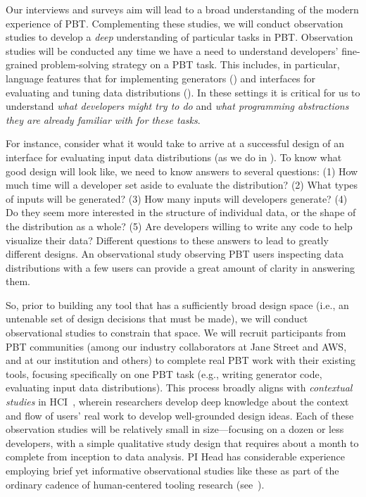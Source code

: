 %
Our interviews and surveys aim will lead to a broad understanding of
the modern experience of PBT. Complementing these studies, we will conduct
observation studies to develop a \emph{deep} understanding of particular tasks
in PBT. Observation studies will be conducted any time we have a need to
understand developers' fine-grained problem-solving strategy on a PBT task.
This includes, in particular, language features that for implementing
generators () and interfaces for evaluating and tuning data
distributions (). In these settings it is critical
for us to understand \emph{what developers might try to do} and \emph{what
programming abstractions they are already familiar with for these tasks}.

For instance, consider what it would take to arrive at a successful design of
an interface for evaluating input data distributions (as we do in
). To know what good design will look like, we need to know
answers to several questions: (1) How much time will a developer set aside to
evaluate the distribution? (2) What types of inputs will be generated? (3) How
many inputs will developers generate? (4) Do they seem more interested in
the structure of individual data, or the shape of the
distribution as a whole? (5) Are developers willing to write any code to
help visualize their data? Different questions to these answers to lead to
greatly different designs. An observational study observing PBT users
inspecting data distributions with a few users can provide a great amount of
clarity in answering them.

So, prior to building any tool that has a sufficiently broad design space (i.e., an
untenable set of design decisions that must be made), we will conduct
observational studies to constrain that space. We will recruit participants
from PBT communities (among our industry collaborators at Jane Street and AWS,
and at our institution and others) to complete real PBT work with their
existing tools, focusing specifically on one PBT task (e.g., writing generator
code, evaluating input data distributions). This process broadly aligns with
\emph{contextual studies} in HCI~\cite[Chapter
3]{ref:holtzblatt1997contextual}, wherein researchers develop deep
knowledge about the context and flow of users' real work to develop well-grounded design
ideas.  Each of these observation studies will be relatively small in
size---focusing on a dozen or less developers, with a simple qualitative study
design that requires about a month to complete from inception to data analysis.
PI Head has considerable experience employing brief yet informative
observational studies like these as part of the ordinary cadence of
human-centered tooling research
(see~\cite{ref:fok2023scim,ref:august2022paper,ref:head2021augmenting,ref:head2018interactive}).

